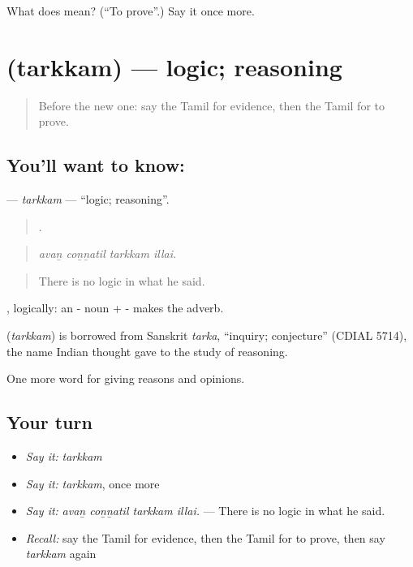 \begin{tcolorbox}[breakable,colback=teal!4,colframe=teal!35!black,title={Before you move on}]
What does  mean? (\textquotedblleft{}To prove\textquotedblright{}.) Say it once more.
\end{tcolorbox}
\section[\texorpdfstring{\ta{தர்க்கம்} (tarkkam)}{தர்க்கம் (tarkkam)}]{ (tarkkam) — logic; reasoning}

\label{lesson:TA-C347-tarkkam}



\begin{quote}
Before the new one: say the Tamil for evidence, then the Tamil for to prove.
\end{quote}

\subsection*{You'll want to know: }
\textbf{} — \emph{tarkkam} — \textquotedblleft{}logic; reasoning\textquotedblright{}.

\begin{quote}
   .
\end{quote}

\begin{quote}
\emph{avaṉ coṉṉatil tarkkam illai.}
\end{quote}

\begin{quote}
There is no logic in what he said.
\end{quote}

, logically: an - noun + - makes the adverb.

\begin{cousinweb}
\textbf{} (\emph{tarkkam}) is borrowed from Sanskrit \emph{tarka}, \textquotedblleft{}inquiry; conjecture\textquotedblright{} (CDIAL 5714), the name Indian thought gave to the study of reasoning.
\end{cousinweb}

\begin{grammarlens}[title={What you've built}]
One more word for giving reasons and opinions.
\end{grammarlens}

\subsection*{Your turn}
\begin{itemize}
\raggedright
  \item \emph{Say it:} \emph{tarkkam}
  \item \emph{Say it:} \emph{tarkkam}, once more
  \item \emph{Say it:} \emph{avaṉ coṉṉatil tarkkam illai.} — There is no logic in what he said.
  \item \emph{Recall:} say the Tamil for evidence, then the Tamil for to prove, then say \emph{tarkkam} again
\end{itemize}


